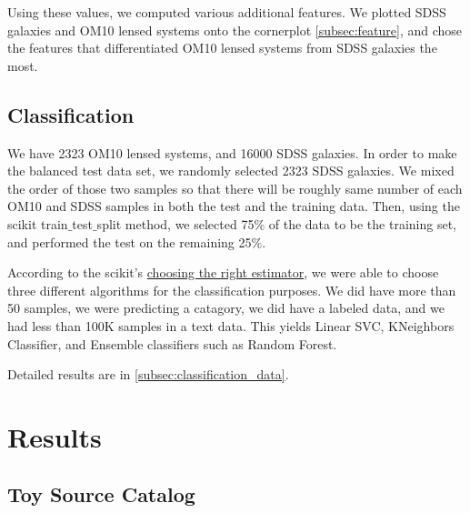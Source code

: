\documentclass[\docopts]{\docclass}
\begin{document}
Using these values, we computed various additional features. We plotted SDSS galaxies and OM10 lensed systems onto the cornerplot \ref{subsec:feature}, and chose the features that differentiated OM10 lensed systems from SDSS galaxies the most.

\subsection{Classification}
\label{subsec:classification}

We have 2323 OM10 lensed systems, and 16000 SDSS galaxies. In order to make the balanced test data set, we randomly selected 2323 SDSS galaxies. We mixed the order of those two samples so that there will be roughly same number of each OM10 and SDSS samples in both the test and the training data. Then, using the scikit train$\_$test$\_$split method, we selected 75$\%$ of the data to be the training set, and performed the test on the remaining 25$\%$.

According to the scikit's \href{http://scikit-learn.org/stable/tutorial/machine_learning_map/index.html} {choosing the right estimator}, we were able to choose three different algorithms for the classification purposes. We did have more than 50 samples, we were predicting a catagory, we did have a labeled data, and we had less than 100K samples in a text data. This yields Linear SVC, KNeighbors Classifier, and Ensemble classifiers such as Random Forest.

Detailed results are in \ref{subsec:classification_data}.


\section{Results}
\label{sec:results}

\subsection{Toy Source Catalog}
\label{subsec:toysource}
\end{document}
